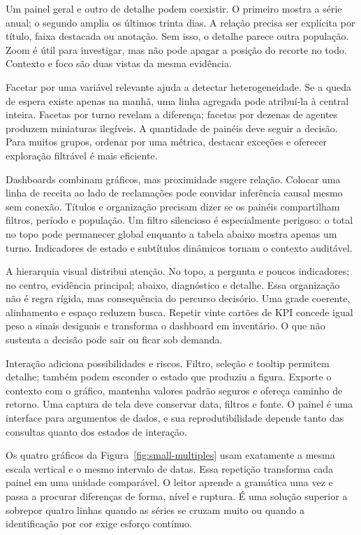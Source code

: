 Um painel geral e outro de detalhe podem coexistir. O primeiro mostra a série anual; o segundo amplia os últimos trinta dias. A relação precisa ser explícita por título, faixa destacada ou anotação. Sem isso, o detalhe parece outra população. Zoom é útil para investigar, mas não pode apagar a posição do recorte no todo. Contexto e foco são duas vistas da mesma evidência.

Facetar por uma variável relevante ajuda a detectar heterogeneidade. Se a queda de espera existe apenas na manhã, uma linha agregada pode atribuí-la à central inteira. Facetas por turno revelam a diferença; facetas por dezenas de agentes produzem miniaturas ilegíveis. A quantidade de painéis deve seguir a decisão. Para muitos grupos, ordenar por uma métrica, destacar exceções e oferecer exploração filtrável é mais eficiente.

Dashboards combinam gráficos, mas proximidade sugere relação. Colocar uma linha de receita ao lado de reclamações pode convidar inferência causal mesmo sem conexão. Títulos e organização precisam dizer se os painéis compartilham filtros, período e população. Um filtro silencioso é especialmente perigoso: o total no topo pode permanecer global enquanto a tabela abaixo mostra apenas um turno. Indicadores de estado e subtítulos dinâmicos tornam o contexto auditável.

A hierarquia visual distribui atenção. No topo, a pergunta e poucos indicadores; no centro, evidência principal; abaixo, diagnóstico e detalhe. Essa organização não é regra rígida, mas consequência do percurso decisório. Uma grade coerente, alinhamento e espaço reduzem busca. Repetir vinte cartões de KPI concede igual peso a sinais desiguais e transforma o dashboard em inventário. O que não sustenta a decisão pode sair ou ficar sob demanda.

Interação adiciona possibilidades e riscos. Filtro, seleção e tooltip permitem detalhe; também podem esconder o estado que produziu a figura. Exporte o contexto com o gráfico, mantenha valores padrão seguros e ofereça caminho de retorno. Uma captura de tela deve conservar data, filtros e fonte. O painel é uma interface para argumentos de dados, e sua reprodutibilidade depende tanto das consultas quanto dos estados de interação.



Os quatro gráficos da Figura~\ref{fig:small-multiples} usam exatamente a mesma escala vertical e o mesmo intervalo de datas. Essa repetição transforma cada painel em uma unidade comparável. O leitor aprende a gramática uma vez e passa a procurar diferenças de forma, nível e ruptura. É uma solução superior a sobrepor quatro linhas quando as séries se cruzam muito ou quando a identificação por cor exige esforço contínuo.

